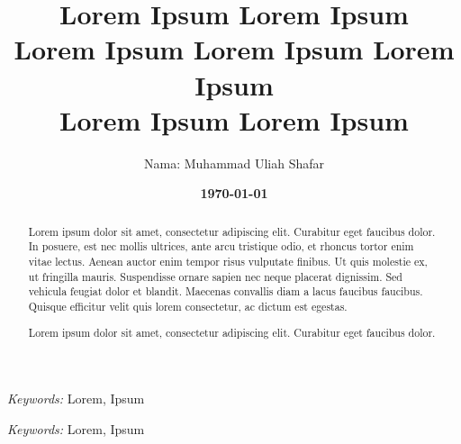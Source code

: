 \documentclass[11pt]{simart} %
\title{
\textbf{Lorem Ipsum Lorem Ipsum \\
Lorem Ipsum Lorem Ipsum Lorem Ipsum} \\
\textbf{{Lorem Ipsum Lorem Ipsum \\}}
} %
\date{\textbf{\today}}
\author{
\begin{tabular}{@{}ll@{}}
	Nama & : Muhammad Uliah Shafar\\
\end{tabular}
}
\begin{document}


\maketitle %

\begin{abstract}
	Lorem ipsum dolor sit amet, consectetur adipiscing elit. Curabitur eget faucibus dolor. In posuere, est nec mollis ultrices, ante arcu tristique odio, et rhoncus tortor enim vitae lectus. Aenean auctor enim tempor risus vulputate finibus. Ut quis molestie ex, ut fringilla mauris. Suspendisse ornare sapien nec neque placerat dignissim. Sed vehicula feugiat dolor et blandit. Maecenas convallis diam a lacus faucibus faucibus. Quisque efficitur velit quis lorem consectetur, ac dictum est egestas.

\end{abstract}

\hspace*{3.6mm}\textit{Keywords:} Lorem, Ipsum %


\begin{otherlanguage}{english}
	\begin{abstract}
		Lorem ipsum dolor sit amet, consectetur adipiscing elit. Curabitur eget faucibus dolor.
	\end{abstract}
\end{otherlanguage}

\hspace*{3.6mm}\textit{Keywords:} Lorem, Ipsum %

\vspace{30pt} %

% 


% 
\end{document}
